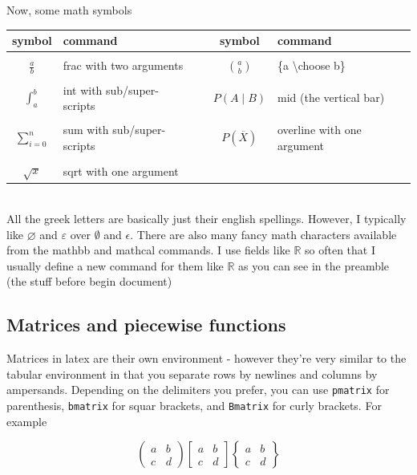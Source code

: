\documentclass{article}
\newcommand{\R}{\mathbb{R}}
\begin{document}
Now, some math symbols~\\

\begin{tabular}{c|lcc|l}
symbol & command & & symbol & command\\
\hline
 & & & & \\
$\frac{a}{b}$ & frac with two arguments &
              & ${a\choose b}$ & \{a \textbackslash choose b\}\\
 & & & & \\
$\int_a^b$ & int with sub/super-scripts &
           & $P(A \mid B)$ & mid (the vertical bar) \\
 & & & & \\
$\sum_{i=0}^n$ & sum with sub/super-scripts &
               & $P(\overline{X})$ & overline with one argument \\
 & & & & \\
$\sqrt{x}$ & sqrt with one argument & & & \\
\end{tabular}

~\\

All the greek letters are basically just their english spellings. However, I
typically like $\varnothing$ and $\varepsilon$ over $\emptyset$ and $\epsilon$.
There are also many fancy math characters available from the 
mathbb and mathcal commands.
I use fields like $\mathbb{R}$ so often that I usually define a new command
for them like $\R$ as you can see in the preamble (the stuff before begin
document)

\subsection*{Matrices and piecewise functions}
Matrices in latex are their own environment - however they're very similar
to the tabular environment in that you separate rows by newlines and columns
by ampersands. Depending on the delimiters you prefer, you can
use \lstinline{pmatrix} for parenthesis, \lstinline{bmatrix} for squar brackets,
and \lstinline{Bmatrix} for curly brackets. For example

\begin{equation*}
\begin{pmatrix} a & b \\ c & d \end{pmatrix}
\begin{bmatrix} a & b \\ c & d \end{bmatrix}
\begin{Bmatrix} a & b \\ c & d \end{Bmatrix}
\end{equation*}
\end{document}
